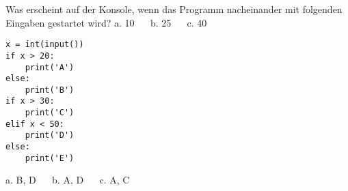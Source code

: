 \question[3] Was erscheint auf der Konsole, wenn das Programm nacheinander mit folgenden Eingaben gestartet wird?
a. 10   ~~  b. 25 ~~ c. 40
\begin{lstlisting}
x = int(input())
if x > 20:
    print('A')
else:
    print('B')
if x > 30:
    print('C')
elif x < 50:
    print('D')
else:
    print('E')
\end{lstlisting}

\begin{solutionbox}{1cm}
a. B, D ~~ b. A, D ~~ c. A, C
\end{solutionbox}

